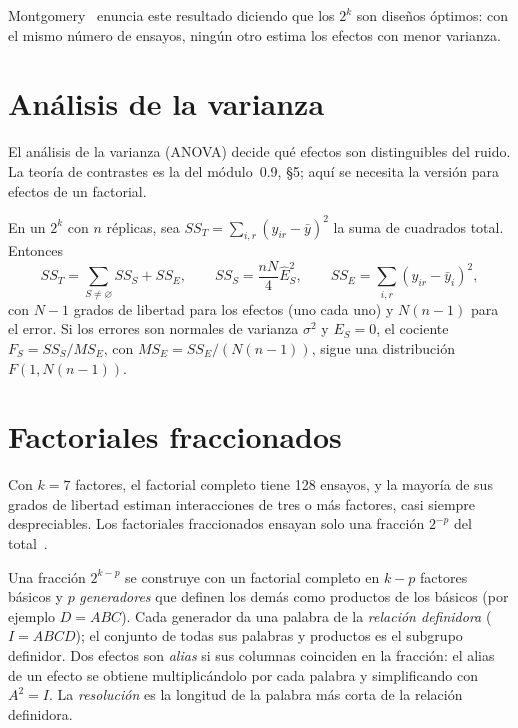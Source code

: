 Montgomery~\cite[§6.7]{montgomery} enuncia este resultado diciendo que los $2^k$ son diseños óptimos: con el mismo número de ensayos, ningún otro estima los efectos con menor varianza.

\section{Análisis de la varianza}

El análisis de la varianza (ANOVA) decide qué efectos son distinguibles del ruido. La teoría de contrastes es la del módulo~0.9, §5; aquí se necesita la versión para efectos de un factorial.

\begin{proposicion}\label{prop:anova}
En un $2^k$ con $n$ réplicas, sea $SS_T=\sum_{i,r}(y_{ir}-\bar y)^2$ la suma de cuadrados total. Entonces
\[
SS_T=\sum_{S\ne\varnothing}SS_S+SS_E,\qquad SS_S=\frac{nN}{4}\hat E_S^{2},\qquad SS_E=\sum_{i,r}(y_{ir}-\bar y_i)^2,
\]
con $N-1$ grados de libertad para los efectos (uno cada uno) y $N(n-1)$ para el error. Si los errores son normales de varianza $\sigma^2$ y $E_S=0$, el cociente $F_S=SS_S/MS_E$, con $MS_E=SS_E/(N(n-1))$, sigue una distribución $F(1,N(n-1))$.
\end{proposicion}

\section{Factoriales fraccionados}

Con $k=7$ factores, el factorial completo tiene 128 ensayos, y la mayoría de sus grados de libertad estiman interacciones de tres o más factores, casi siempre despreciables. Los factoriales fraccionados ensayan solo una fracción $2^{-p}$ del total~\cite[cap.~8]{montgomery}.

\begin{definicion}\label{def:fraccion}
Una fracción $2^{k-p}$ se construye con un factorial completo en $k-p$ factores básicos y $p$ \emph{generadores} que definen los demás como productos de los básicos (por ejemplo $D=ABC$). Cada generador da una palabra de la \emph{relación definidora} ($I=ABCD$); el conjunto de todas sus palabras y productos es el subgrupo definidor. Dos efectos son \emph{alias} si sus columnas coinciden en la fracción: el alias de un efecto se obtiene multiplicándolo por cada palabra y simplificando con $A^2=I$. La \emph{resolución} es la longitud de la palabra más corta de la relación definidora.
\end{definicion}

